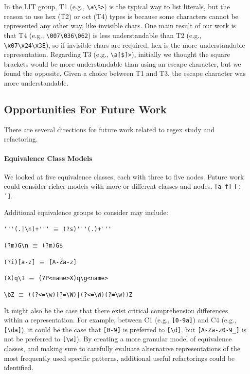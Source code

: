 In the LIT group, T1 (e.g., \verb!\a\$>!) is the typical way to list literals, but the reason to use hex (T2) or oct (T4) types is because some characters cannot be represented any other way, like invisible chars.  One main result of our work is that  T4 (e.g., \verb!\007\036\062!) is  less understandable   than T2 (e.g., \verb!\x07\x24\x3E!), so if invisible chars are required, hex is the more understandable representation.
Regarding T3 (e.g., \verb!\a[$]>!), initially we thought the square brackets would be more understandable than using an escape character,  but we found the opposite. Given a choice between T1 and T3, the escape character was more understandable.

\subsection{Opportunities For Future Work}
There are several directions for future work related to regex study and refactoring.

\paragraph{Equivalence Class Models}
We looked at five equivalence classes, each with three to five nodes.
Future work could consider richer models with more or different classes and nodes.
\verb![a-f]!
 \verb![:-`]!.

Additional equivalence groups to consider may include:
\begin{description} \itemsep -2pt
\item[Single line option]  \verb!'''(.|\n)+'''! $\equiv$ \verb!(?s)'''(.)+'''!
\item[Multi line option]  \verb!(?m)G\n! $\equiv$ \verb!(?m)G$!
\item[Case insensitive]  \verb!(?i)[a-z]! $\equiv$ \verb![A-Za-z]!
\item[Backreferences]  \verb!(X)q\1! $\equiv$ \verb!(?P<name>X)q\g<name>!
\item[Word Boundaries]  \verb!\bZ! $\equiv$ \verb!((?<=\w)(?=\W)|(?<=\W)(?=\w))Z!
\end{description}

It might also be the case that there exist critical comprehension differences within a representation. For example, between C1 (e.g., \verb![0-9a]!) and C4 (e.g., \verb![\da]!), it could be the case that \verb![0-9]! is preferred to \verb![\d]!, but \verb![A-Za-z0-9_]! is not be preferred to \verb![\w]!).
By creating a more granular model of equivalence classes, and making sure to carefully evaluate alternative representations of the most frequently used specific patterns,  additional useful refactorings could be identified.

